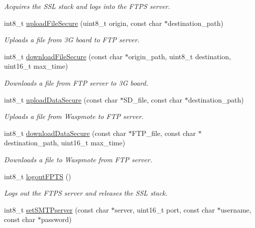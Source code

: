 \begin{DoxyCompactItemize}
\begin{DoxyCompactList}\small\item\em Acquires the S\+SL stack and logs into the F\+T\+PS server. \end{DoxyCompactList}\item 
int8\+\_\+t \hyperlink{class_wasp3_g_a440e150ad06b72da5e04163b973d51c5}{upload\+File\+Secure} (uint8\+\_\+t origin, const char $\ast$destination\+\_\+path)
\begin{DoxyCompactList}\small\item\em Uploads a file from 3G board to F\+TP server. \end{DoxyCompactList}\item 
int8\+\_\+t \hyperlink{class_wasp3_g_ace1592020a15a5748a2725d70bca4502}{download\+File\+Secure} (const char $\ast$origin\+\_\+path, uint8\+\_\+t destination, uint16\+\_\+t max\+\_\+time)
\begin{DoxyCompactList}\small\item\em Downloads a file from F\+TP server to 3G board. \end{DoxyCompactList}\item 
int8\+\_\+t \hyperlink{class_wasp3_g_a2b76a9603a5920bea522b72c7b47fda0}{upload\+Data\+Secure} (const char $\ast$S\+D\+\_\+file, const char $\ast$destination\+\_\+path)
\begin{DoxyCompactList}\small\item\em Uploads a file from Waspmote to F\+TP server. \end{DoxyCompactList}\item 
int8\+\_\+t \hyperlink{class_wasp3_g_a00b146359e68f5eb56e10229688b38ca}{download\+Data\+Secure} (const char $\ast$F\+T\+P\+\_\+file, const char $\ast$destination\+\_\+path, uint16\+\_\+t max\+\_\+time)
\begin{DoxyCompactList}\small\item\em Downloads a file to Waspmote from F\+TP server. \end{DoxyCompactList}\item 
int8\+\_\+t \hyperlink{class_wasp3_g_a1bcabfd5e82abcb73a0fe04d3e01a65c}{logout\+F\+P\+TS} ()
\begin{DoxyCompactList}\small\item\em Logs out the F\+T\+PS server and releases the S\+SL stack. \end{DoxyCompactList}\item 
int8\+\_\+t \hyperlink{class_wasp3_g_ae1e52b0b46732266f0e53200921d8e90}{set\+S\+M\+T\+Pserver} (const char $\ast$server, uint16\+\_\+t port, const char $\ast$username, const char $\ast$password)

\end{DoxyCompactItemize}
